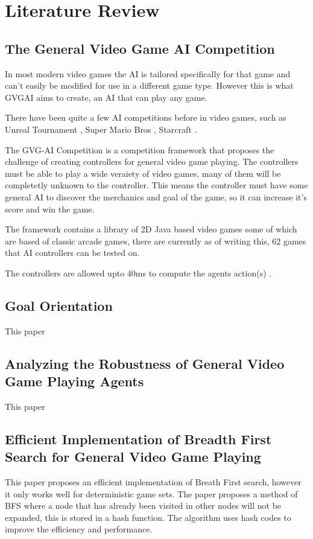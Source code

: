 \documentclass[journal]{IEEEtran}
\begin{document}
\section{Literature Review}
\subsection{The General Video Game AI Competition}

In most modern video games the AI is tailored specifically for that game and can't easily be modified for use in a different game type. However this is what GVGAI aims to create, an AI that can play any game.

There have been quite a few AI competitions before in video games, such as Unreal Tournament \cite{citationNeeded}, Super Mario Bros \cite{citationNeeded}, Starcraft \cite{citationNeeded} \cite{perez20162014}. 


The GVG-AI Competition is a competition framework that proposes the challenge of creating controllers for general video game playing. The controllers must be able to play a wide veraiety of video games, many of them will be completetly unknown to the controller. This means the controller must have some general AI to discover the merchanics and goal of the game, so it can increase it's score and win the game. \cite{GVGAI, perez20162014}

The framework contains a library of 2D Java based video games some of which are based of classic arcade games, there are currently as of writing this, 62 games that AI controllers can be tested on.

The controllers are allowed upto 40ms to compute the agents action(s) \cite{perez2016GVGAICompetition, GVGAI}.

\subsection{Goal Orientation}
This paper 
\cite{ross2014general}


\subsection{Analyzing the Robustness of General Video Game Playing Agents}
This paper 
\cite{perez2016analyzing}

\subsection{Efficient Implementation of Breadth First Search for General Video Game Playing}
This paper proposes an efficient implementation of Breath First search, however it only works well for deterministic game sets.
The paper proposes a method of BFS where a node that has already been visited in other nodes will not be expanded, this is stored in a hash function.
The algorithm uses hash codes to improve the efficiency and performance.
\end{document}
